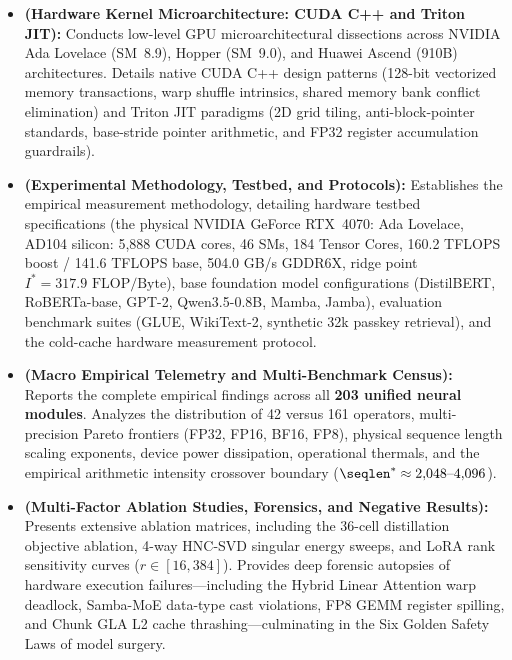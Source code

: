\begin{itemize}
    \item \textbf{ (Hardware Kernel Microarchitecture: CUDA C++ and Triton JIT):}
    Conducts low-level GPU microarchitectural dissections across NVIDIA Ada Lovelace (SM~8.9), Hopper (SM~9.0), and Huawei Ascend (910B) architectures.
    Details native CUDA C++ design patterns (128-bit vectorized memory transactions, warp shuffle intrinsics, shared memory bank conflict elimination) and Triton JIT paradigms (2D grid tiling, anti-block-pointer standards, base-stride pointer arithmetic, and FP32 register accumulation guardrails).

    \item \textbf{ (Experimental Methodology, Testbed, and Protocols):}
    Establishes the empirical measurement methodology, detailing hardware testbed specifications (the physical NVIDIA GeForce RTX~4070: Ada Lovelace, AD104 silicon: 5,888 CUDA cores, 46 SMs, 184 Tensor Cores, 160.2 TFLOPS boost / 141.6 TFLOPS base, 504.0 GB/s GDDR6X, ridge point $I^* = 317.9\text{ FLOP/Byte}$), base foundation model configurations (DistilBERT, RoBERTa-base, GPT-2, Qwen3.5-0.8B, Mamba, Jamba), evaluation benchmark suites (GLUE, WikiText-2, synthetic 32k passkey retrieval), and the cold-cache hardware measurement protocol.

    \item \textbf{ (Macro Empirical Telemetry and Multi-Benchmark Census):}
    Reports the complete empirical findings across all \textbf{203 unified neural modules}.
    Analyzes the distribution of 42 \passfast{} versus 161 \passslow{} operators, multi-precision Pareto frontiers (FP32, FP16, BF16, FP8), physical sequence length scaling exponents, device power dissipation, operational thermals, and the empirical arithmetic intensity crossover boundary ($\seqlen^* \approx 2{,}048\text{--}4{,}096$).

    \item \textbf{ (Multi-Factor Ablation Studies, Forensics, and Negative Results):}
    Presents extensive ablation matrices, including the 36-cell distillation objective ablation, 4-way HNC-SVD singular energy sweeps, and LoRA rank sensitivity curves ($r \in [16, 384]$).
    Provides deep forensic autopsies of hardware execution failures—including the Hybrid Linear Attention warp deadlock, Samba-MoE data-type cast violations, FP8 GEMM register spilling, and Chunk GLA L2 cache thrashing—culminating in the Six Golden Safety Laws of model surgery.


\end{itemize}
